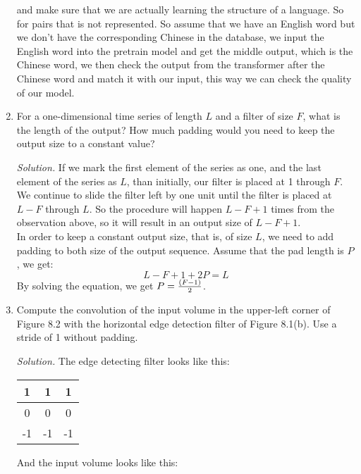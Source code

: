 \documentclass[12pt]{article}
\newcommand\sol[1] {
    \begin{mdframed}
        \emph{Solution.} #1
    \end{mdframed}
}
\begin{document}
\begin{enumerate}[ref=\theenumi]
{            and make sure that we are actually learning the structure of a language. So for pairs
            that is not represented. So assume that we have an English word but we don't have
            the corresponding Chinese in the database, we input the English word into the pretrain
            model and get the middle output, which is the Chinese word, we then check the output from
            the transformer after the Chinese word and match it with our input, this way we can check 
            the quality of our model.
        }
    \item For a one-dimensional time series of length $L$ and a filter of size $F$, what is the length of
            the output? How much padding would you need to keep the output size to a constant
            value?
        \sol{
            If we mark the first element of the series as one, and the last element of the
            series as $L$, than initially, our filter is placed at 1 through $F$. We continue
            to slide the filter left by one unit until the filter is placed at $L - F$ through $L$.
            So the procedure will happen $L - F + 1$ times from the observation above, so it
            will result in an output size of $L - F + 1$. \\
            In order to keep a constant output size, that is, of size $L$, we need to add
            padding to both size of the output sequence. Assume that the pad length is $P$, we get:
            \[
                L - F + 1 + 2P = L
            \]
            By solving the equation, we get $P = {(F - 1) \over 2}$.
        }
    \item Compute the convolution of the input volume in the upper-left corner of Figure 8.2
            with the horizontal edge detection filter of Figure 8.1(b). Use a stride of 1 without
            padding.
        \sol {
            The edge detecting filter looks like this:
            \begin{center}
                \begin{tabular}{ | c | c | c | }
                    \hline
                    1 & 1 & 1 \\
                    \hline
                    0 & 0 & 0 \\
                    \hline
                    -1 & -1 & -1 \\
                    \hline
                \end{tabular}
            \end{center}
            And the input volume looks like this:
}
\end{enumerate}
\end{document}
